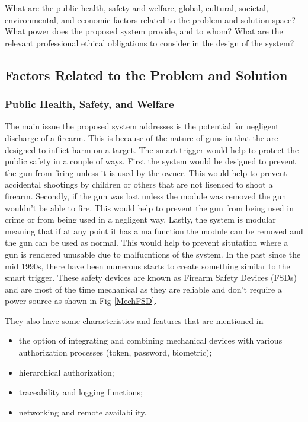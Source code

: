 



What are the public health, safety and welfare, global, cultural, societal, environmental, 
and economic factors related to the problem and solution space? What power does the proposed system 
provide, and to whom? What are the relevant professional ethical obligations to consider in the design 
of the system?

\subsection{Factors Related to the Problem and Solution}

\subsubsection{Public Health, Safety, and Welfare}
The main issue the proposed system addresses is the potential for negligent discharge of a firearm. This is because of the nature of guns in that the are designed
to inflict harm on a target. The smart trigger would help to protect the public safety in a couple of ways. First the system would be designed to prevent the gun from 
firing unless it is used by the owner. This would help to prevent accidental shootings by children or others that are not lisenced to shoot a firearm. Secondly, if the gun was lost unless
the module was removed the gun wouldn't be able to fire. This would help to prevent the gun from being used in crime or from being used in a negligent way. 
Lastly, the system is modular meaning that if at any point it has a malfunction the module can be removed and the gun can be used as normal. 
This would help to prevent situtation where a gun is rendered unusable due to malfucntions of the system. In the past since the mid 1990s, there have been numerous 
starts to create something similar to the smart trigger. These safety devices are known as Firearm Safety Devices (FSDs) and are most of the time mechanical as 
they are reliable and don't require a power source as shown in Fig \ref{MechFSD}.

They also have some characteristics and features that are mentioned in \cite{devices2013personalized} 
\begin{itemize}
    \item the option of integrating and combining mechanical devices with various authorization processes (token, password, biometric);
    \item hierarchical authorization;
    \item traceability and logging functions;
    \item networking and remote availability.
\end{itemize}


